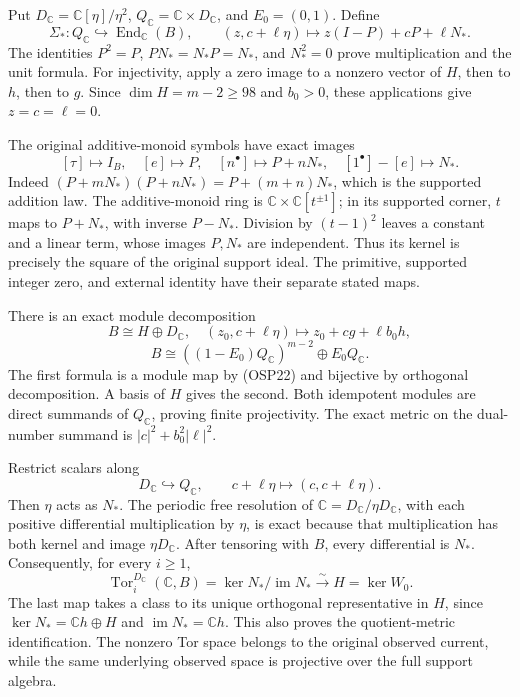 \documentclass[
]{article}
\begin{document}
Put \(D_{\mathbb C}=\mathbb C[\eta]/\eta^2\),
\(Q_{\mathbb C}=\mathbb C\times D_{\mathbb C}\), and \(E_0=(0,1)\).
Define \[
\Sigma_*:Q_{\mathbb C}\hookrightarrow\operatorname{End}_{\mathbb C}(B),
\qquad(z,c+\ell\eta)\longmapsto z(I-P)+cP+\ell N_*.
\tag{OSP22}
\] The identities \(P^2=P\), \(PN_*=N_*P=N_*\), and \(N_*^2=0\) prove
multiplication and the unit formula. For injectivity, apply a zero image
to a nonzero vector of \(H\), then to \(h\), then to \(g\). Since
\(\dim H=m-2\ge98\) and \(b_0>0\), these applications give
\(z=c=\ell=0\).

The original additive-monoid symbols have exact images \[
[\tau]\mapsto I_B,\quad [e]\mapsto P,\quad
[n^\bullet]\mapsto P+nN_*,\quad [1^\bullet]-[e]\mapsto N_*.
\tag{OSP23}
\] Indeed \((P+mN_*)(P+nN_*)=P+(m+n)N_*\), which is the supported
addition law. The additive-monoid ring is
\(\mathbb C\times\mathbb C[t^{\pm1}]\); in its supported corner, \(t\)
maps to \(P+N_*\), with inverse \(P-N_*\). Division by \((t-1)^2\)
leaves a constant and a linear term, whose images \(P,N_*\) are
independent. Thus its kernel is precisely the square of the original
support ideal. The primitive, supported integer zero, and external
identity have their separate stated maps.

There is an exact module decomposition \[
B\cong H\oplus D_{\mathbb C},\quad
(z_0,c+\ell\eta)\longmapsto z_0+cg+\ell b_0h,
\] \[
B\cong((1-E_0)Q_{\mathbb C})^{m-2}\oplus E_0Q_{\mathbb C}.
\tag{OSP24}
\] The first formula is a module map by (OSP22) and bijective by
orthogonal decomposition. A basis of \(H\) gives the second. Both
idempotent modules are direct summands of \(Q_{\mathbb C}\), proving
finite projectivity. The exact metric on the dual-number summand is
\(|c|^2+b_0^2|\ell|^2\).

Restrict scalars along \[
D_{\mathbb C}\hookrightarrow Q_{\mathbb C},\qquad
c+\ell\eta\longmapsto(c,c+\ell\eta).
\tag{OSP25}
\] Then \(\eta\) acts as \(N_*\). The periodic free resolution of
\(\mathbb C=D_{\mathbb C}/\eta D_{\mathbb C}\), with each positive
differential multiplication by \(\eta\), is exact because that
multiplication has both kernel and image \(\eta D_{\mathbb C}\). After
tensoring with \(B\), every differential is \(N_*\). Consequently, for
every \(i\ge1\), \[
\operatorname{Tor}^{D_{\mathbb C}}_i(\mathbb C,B)
=\ker N_*/\operatorname{im}N_*
\xrightarrow{\sim}H=\ker W_0.
\tag{OSP26}
\] The last map takes a class to its unique orthogonal representative in
\(H\), since \(\ker N_*=\mathbb Ch\oplus H\) and
\(\operatorname{im}N_*=\mathbb Ch\). This also proves the
quotient-metric identification. The nonzero Tor space belongs to the
original observed current, while the same underlying observed space is
projective over the full support algebra.
\end{document}

